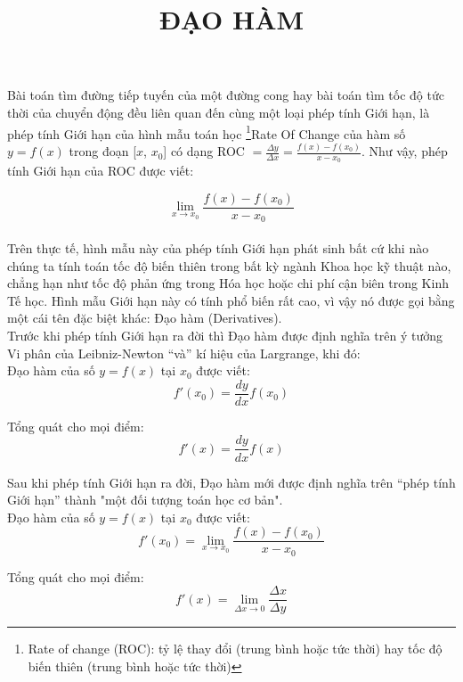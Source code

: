 \documentclass[a4paper,10pt]{article}
\title{\vspace{-8ex} \bfseries ĐẠO HÀM}
\date{\vspace{-8ex}}
\begin{document}
\maketitle
Bài toán tìm đường tiếp tuyến của một đường cong hay bài toán tìm tốc độ tức thời của chuyển động đều liên quan đến cùng một loại phép tính Giới hạn, là phép tính Giới hạn của hình mẫu toán học \footnote{Rate of change (ROC): tỷ lệ thay đổi (trung bình hoặc tức thời) hay tốc độ biến thiên (trung bình hoặc tức thời)}Rate Of Change của hàm số $y=f(x)$ trong đoạn [$x$, $x_0$] có dạng ROC $= \frac{\Delta y}{\Delta x}=\frac{f(x)-f(x_0)}{x-x_0}$. Như vậy, phép tính Giới hạn của ROC được viết:


$$ \lim_{x \to x_0} \frac{f(x)-f(x_0)}{x-x_0} $$\\

Trên thực tế, hình mẫu này của phép tính Giới hạn phát sinh bất cứ khi nào chúng ta tính toán tốc độ biến thiên trong bất kỳ ngành Khoa học kỹ thuật nào, chẳng hạn như tốc độ phản ứng trong Hóa học hoặc chi phí cận biên trong Kinh Tế học. Hình mẫu Giới hạn này có tính phổ biến rất cao, vì vậy nó được gọi bằng một cái tên đặc biệt khác: Đạo hàm (Derivatives).\\

Trước khi phép tính Giới hạn ra đời thì Đạo hàm được định nghĩa trên ý tưởng Vi phân của Leibniz-Newton “và” kí hiệu của Largrange, khi đó:\\

Đạo hàm của số $y=f(x)$ tại $x_0$ được viết: $$f'(x_0)=\frac{dy}{dx}f(x_0)$$

Tổng quát cho mọi điểm: $$f'(x)=\frac{dy}{dx}f(x)$$

Sau khi phép tính Giới hạn ra đời, Đạo hàm mới được định nghĩa trên “phép tính Giới hạn” thành "một đối tượng toán học cơ bản".\\

Đạo hàm của số $y=f(x)$ tại $x_0$ được viết:
$$f'(x_0)=\lim_{x \to x_0} \frac{f(x)-f(x_0)}{x-x_0}$$

Tổng quát cho mọi điểm: $$ f'(x)=\lim_{\Delta x \to 0}\frac{\Delta x}{\Delta y} $$
\end{document}
